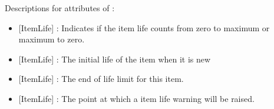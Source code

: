 Descriptions for attributes of :

\begin{itemize}

\item {}[ItemLife] : Indicates if the item life counts from zero to maximum or maximum to zero.

\item {}[ItemLife] : The initial life of the item when it is new

\item {}[ItemLife] : The end of life limit for this item.

\item {}[ItemLife] : The point at which a item life warning will be raised.

\end{itemize}
